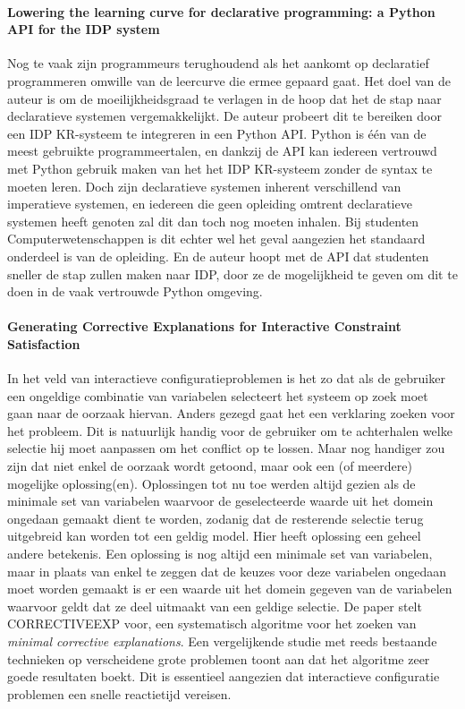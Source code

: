 \paragraph{Lowering the learning curve for declarative programming: a Python API for the IDP system \cite{vennekens2015lowering}}
Nog te vaak zijn programmeurs terughoudend als het aankomt op declaratief programmeren omwille van de leercurve die ermee gepaard gaat. Het doel van de auteur is om de moeilijkheidsgraad te verlagen in de hoop dat het de stap naar declaratieve systemen vergemakkelijkt. De auteur probeert dit te bereiken door een IDP KR-systeem te integreren in een Python API. Python is \'{e}\'{e}n van de meest gebruikte programmeertalen, en dankzij de API kan iedereen vertrouwd met Python gebruik maken van het het IDP KR-systeem zonder de syntax te moeten leren. Doch zijn declaratieve systemen inherent verschillend van imperatieve systemen, en iedereen die geen opleiding omtrent declaratieve systemen heeft genoten zal dit dan toch nog moeten inhalen. Bij studenten Computerwetenschappen is dit echter wel het geval aangezien het standaard onderdeel is van de opleiding. En de auteur hoopt met de API dat studenten sneller de stap zullen maken naar IDP, door ze de mogelijkheid te geven om dit te doen in de vaak vertrouwde Python omgeving.

\paragraph{Generating Corrective Explanations for Interactive Constraint Satisfaction \cite{o2005generating}}
In het veld van interactieve configuratieproblemen is het zo dat als de gebruiker een ongeldige combinatie van variabelen selecteert het systeem op zoek moet gaan naar de oorzaak hiervan. Anders gezegd gaat het een verklaring zoeken voor het probleem. Dit is natuurlijk handig voor de gebruiker om te achterhalen welke selectie hij moet aanpassen om het conflict op te lossen. Maar nog handiger zou zijn dat niet enkel de oorzaak wordt getoond, maar ook een (of meerdere) mogelijke oplossing(en). Oplossingen tot nu toe werden altijd gezien als de minimale set van variabelen waarvoor de geselecteerde waarde uit het domein ongedaan gemaakt dient te worden, zodanig dat de resterende selectie terug uitgebreid kan worden tot een geldig model. Hier heeft oplossing een geheel andere betekenis. Een oplossing is nog altijd een minimale set van variabelen, maar in plaats van enkel te zeggen dat de keuzes voor deze variabelen ongedaan moet worden gemaakt is er een waarde uit het domein gegeven van de variabelen waarvoor geldt dat ze deel uitmaakt van een geldige selectie. De paper stelt CORRECTIVEEXP voor, een systematisch algoritme voor het zoeken van \emph{minimal corrective explanations}. Een vergelijkende studie met reeds bestaande technieken op verscheidene grote problemen toont aan dat het algoritme zeer goede resultaten boekt. Dit is essentieel aangezien dat interactieve configuratie problemen een snelle reactietijd vereisen.


